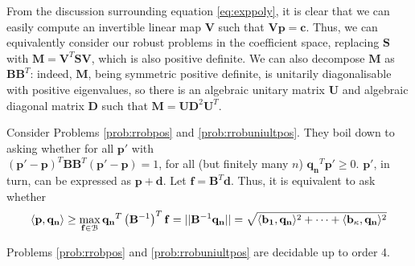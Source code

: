 From the discussion surrounding equation \ref{eq:exppoly}, it is clear that we can easily compute an invertible linear map $\mathbf{V}$ such that $\mathbf{Vp} = \mathbf{c}$. Thus, we can equivalently consider our robust problems in the coefficient space, replacing $\mathbf{S}$ with $\mathbf{M} = \mathbf{V}^T\mathbf{SV}$, which is also positive definite. We can also decompose $\mathbf{M}$ as $\mathbf{B}\mathbf{B}^T$: indeed, $\mathbf{M}$, being symmetric positive definite, is unitarily diagonalisable with positive eigenvalues, so there is an algebraic unitary matrix $\mathbf{U}$ and algebraic diagonal matrix $\mathbf{D}$ such that $\mathbf{M} = \mathbf{U}\mathbf{D}^2\mathbf{U}^T$.

Consider Problems \ref{prob:rrobpos} and \ref{prob:rrobuniultpos}. They boil down to asking whether for all $\mathbf{p'}$ with\\ 
$(\mathbf{p'}-\mathbf{p})^T\mathbf{BB}^T(\mathbf{p'} - \mathbf{p}) = 1$, for all (but finitely many $n$) $\mathbf{q_n}^T\mathbf{p'} \ge 0$. $\mathbf{p'}$, in turn, can be expressed as $\mathbf{p} + \mathbf{d}$. Let $\mathbf{f} = \mathbf{B}^T\mathbf{d}$. Thus, it is equivalent to ask whether
\begin{equation}
\label{eq:crux}
\langle\mathbf{p}, \mathbf{q_n}\rangle \ge \max_{\mathbf{f} \in \mathcal{B}}\mathbf{q_n}^T\left(\mathbf{B}^{-1}\right)^T\mathbf{f} = ||\mathbf{B}^{-1}\mathbf{q_n}|| = \sqrt{\langle\mathbf{b_1}, \mathbf{q_n}\rangle^2 +\dots+\langle\mathbf{b_\kappa}, \mathbf{q_n}\rangle^2}
\end{equation}

\begin{theorem}
\label{thm:decide}
Problems \ref{prob:rrobpos} and \ref{prob:rrobuniultpos} are decidable up to order 4.
\end{theorem}

